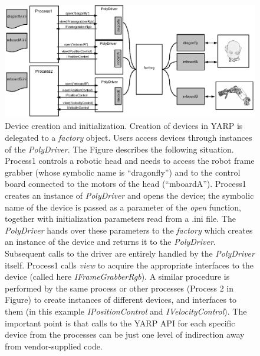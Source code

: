 %
%

\begin{figure}[tbp]
\centerline{
\includegraphics[width=20cm]{fig-devices4}
}
\caption{Device creation and initialization. Creation of 
devices in YARP is delegated to a \emph{factory} object. Users 
access devices through instances of the \emph{PolyDriver}. The 
Figure describes the following situation. Process1 controls a robotic
head and needs to access the robot frame grabber (whose symbolic name 
is ``dragonfly'') and to the control board connected to the motors of 
the head (``mboardA''). Process1 creates an instance of 
\emph{PolyDriver} and opens 
the device; the symbolic name of the device is passed as a parameter
of the \emph{open} function, together with initialization parameters 
read from a .ini file. The \emph{PolyDriver} hands over these parameters 
to the \emph{factory} which creates an instance of the device and returns
it to the \emph{PolyDriver}. Subsequent calls to the driver are entirely 
handled by the \emph{PolyDriver} itself. Process1 calls \emph{view} to 
acquire the appropriate interfaces to the device (called here 
\emph{IFrameGrabberRgb}). A similar procedure 
is performed by the same process or other processes (Process 2 in Figure) 
to create instances of different devices, and interfaces to them (in this 
example \emph{IPositionControl} and \emph{IVelocityControl}).
The important point is that calls to the YARP API for 
each specific device from the processes can be just one 
level of indirection away from vendor-supplied code.
}\label{fig:devices4}
\end{figure}

